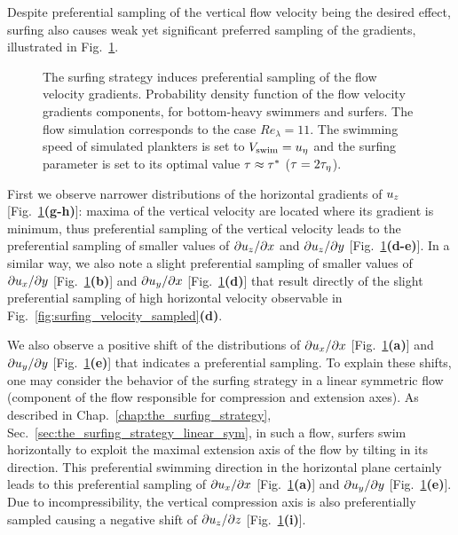 Despite preferential sampling of the vertical flow velocity being the desired effect, surfing also causes weak yet significant preferred sampling of the gradients, illustrated in Fig.~\ref{fig:surfing_gradient_sampled}.
\begin{figure}[t]
	\centering
	
	\caption[The surfing strategy induces preferential sampling of the flow velocity gradients.]{
		The surfing strategy induces preferential sampling of the flow velocity gradients.
		Probability density function of the flow velocity gradients components, for bottom-heavy swimmers and surfers. 
		The flow simulation corresponds to the case $\mathit{Re}_{\lambda} = 11$. The swimming speed of simulated plankters is set to $V_{\mathrm{swim}} = u_{\eta}$ and the surfing parameter is set to its optimal value $\tau \approx \tau^*$ ($\tau = 2 \tau_{\eta}$).
	}
	\label{fig:surfing_gradient_sampled}
\end{figure}
First we observe narrower distributions of the horizontal gradients of $u_{z}$ [Fig.~\ref{fig:surfing_gradient_sampled}\textbf{(g-h)}]: maxima of the vertical velocity are located where its gradient is minimum, thus preferential sampling of the vertical velocity leads to the preferential sampling of smaller values of $\partial u_z/\partial x$ and $\partial u_z/\partial y$ [Fig.~\ref{fig:surfing_gradient_sampled}\textbf{(d-e)}].
In a similar way, we also note a slight preferential sampling of smaller values of $\partial u_x/\partial y$ [Fig.~\ref{fig:surfing_gradient_sampled}\textbf{(b)}] and $\partial u_y/\partial x$ [Fig.~\ref{fig:surfing_gradient_sampled}\textbf{(d)}] that result directly of the slight preferential sampling of high horizontal velocity observable in Fig.~\ref{fig:surfing_velocity_sampled}\textbf{(d)}.

We also observe a positive shift of the distributions of $\partial u_x/\partial x$ [Fig.~\ref{fig:surfing_gradient_sampled}\textbf{(a)}] and $\partial u_y/\partial y$ [Fig.~\ref{fig:surfing_gradient_sampled}\textbf{(e)}] that indicates a preferential sampling.
To explain these shifts, one may consider the behavior of the surfing strategy in a linear symmetric flow (component of the flow responsible for compression and extension axes).
As described in Chap.~\ref{chap:the_surfing_strategy}, Sec.~\ref{sec:the_surfing_strategy_linear_sym}, in such a flow, surfers swim horizontally to exploit the maximal extension axis of the flow by tilting in its direction.
This preferential swimming direction in the horizontal plane certainly leads to this preferential sampling of $\partial u_x/\partial x$ [Fig.~\ref{fig:surfing_gradient_sampled}\textbf{(a)}] and $\partial u_y/\partial y$ [Fig.~\ref{fig:surfing_gradient_sampled}\textbf{(e)}].
Due to incompressibility, the vertical compression axis is also preferentially sampled causing a negative shift of $\partial u_z/\partial z$ [Fig.~\ref{fig:surfing_gradient_sampled}\textbf{(i)}].

